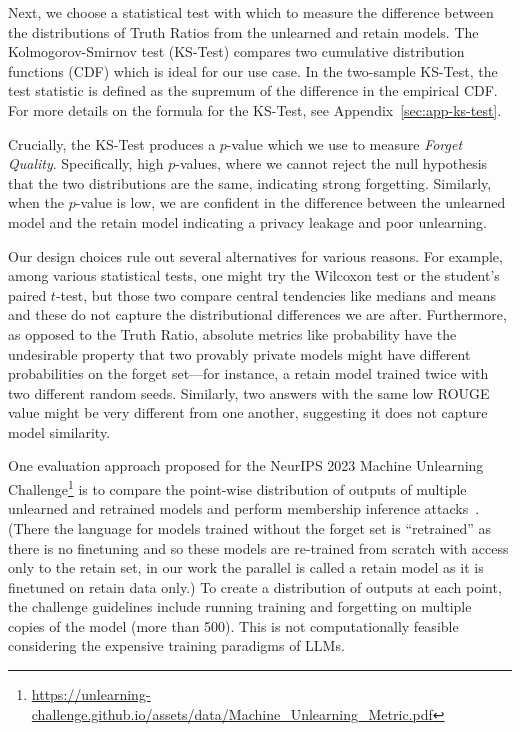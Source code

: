 Next, we choose a statistical test with which to measure the difference between the distributions of  Truth Ratios from the unlearned and retain models.
The Kolmogorov-Smirnov test (KS-Test) compares two cumulative distribution functions (CDF) which is ideal for our use case.
In the two-sample KS-Test, the test statistic is defined as the supremum of the difference in the empirical CDF. For more details on the formula for the KS-Test, see Appendix~\ref{sec:app-ks-test}.

Crucially, the KS-Test produces a $p$-value which we use to measure \emph{Forget Quality}.
Specifically, high $p$-values, where we cannot reject the null hypothesis that the two distributions are the same, indicating strong forgetting.
Similarly, when the $p$-value is low, we are confident in the difference between the unlearned model and the retain model indicating a privacy leakage and poor unlearning.

Our design choices rule out several alternatives for various reasons.
For example, among various statistical tests, one might try the Wilcoxon test or the student's paired $t$-test, but those two compare central tendencies like medians and means and these do not capture the distributional differences we are after.
Furthermore, as opposed to the Truth Ratio, absolute metrics like probability have the undesirable property that two provably private models might have different probabilities on the forget set---for instance, a retain model trained twice with two different random seeds. 
Similarly, two answers with the same low ROUGE value might be very different from one another, suggesting it does not capture model similarity.

One evaluation approach proposed for the NeurIPS 2023 Machine Unlearning Challenge\footnote{\url{https://unlearning-challenge.github.io/assets/data/Machine_Unlearning_Metric.pdf}} is to compare the point-wise distribution of outputs of multiple unlearned and retrained models and perform membership inference attacks~\citep{shokri2017membership}.
(There the language for models trained without the forget set is ``retrained'' as there is no finetuning and so these models are re-trained from scratch with access only to the retain set, in our work the parallel is called a retain model as it is finetuned on retain data only.) 
To create a distribution of outputs at each point, the challenge guidelines include running training and forgetting on multiple copies of the model (more than 500). 
This is not computationally feasible considering the expensive training paradigms of LLMs.




